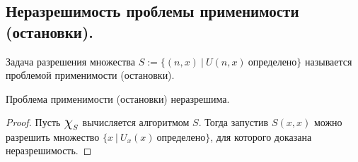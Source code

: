 \subsection{Неразрешимость проблемы применимости (остановки).}

\begin{definition}
  Задача разрешения множества $S := \{ (n,x) \> | \> U(n,x) \> \textit{определено} \}$ называется проблемой применимости (остановки).
\end{definition}

\begin{theorem}
  Проблема применимости (остановки) неразрешима.
  \begin{proof}
    Пусть $\mbox{\Large$\chi$}_S$ вычисляется алгоритмом $S$. Тогда запустив $S(x,x)$ можно разрешить множество $\{x \> | \> U_x(x) \> \textit{определено} \}$, для которого доказана неразрешимость.
  \end{proof}
\end{theorem}